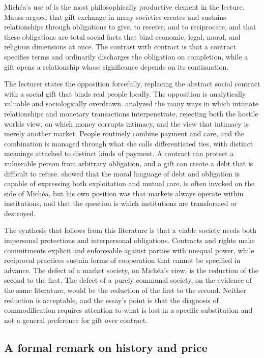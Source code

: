\documentclass[12pt]{article}
\begin{document}
Michéa's use of \citet{mauss} is the most philosophically productive element in the lecture. Mauss argued that gift exchange in many societies creates and sustains relationships through obligations to give, to receive, and to reciprocate, and that these obligations are total social facts that bind economic, legal, moral, and religious dimensions at once. The contrast with contract is that a contract specifies terms and ordinarily discharges the obligation on completion, while a gift opens a relationship whose significance depends on its continuation.

The lecturer states the opposition forcefully, replacing the abstract social contract with a social gift that binds real people locally. The opposition is analytically valuable and sociologically overdrawn. \citet{zelizer} analyzed the many ways in which intimate relationships and monetary transactions interpenetrate, rejecting both the hostile worlds view, on which money corrupts intimacy, and the view that intimacy is merely another market. People routinely combine payment and care, and the combination is managed through what she calls differentiated ties, with distinct meanings attached to distinct kinds of payment. A contract can protect a vulnerable person from arbitrary obligation, and a gift can create a debt that is difficult to refuse. \citet{graeber} showed that the moral language of debt and obligation is capable of expressing both exploitation and mutual care. \citet{polanyi} is often invoked on the side of Michéa, but his own position was that markets always operate within institutions, and that the question is which institutions are transformed or destroyed.

The synthesis that follows from this literature is that a viable society needs both impersonal protections and interpersonal obligations. Contracts and rights make commitments explicit and enforceable against parties with unequal power, while reciprocal practices sustain forms of cooperation that cannot be specified in advance. The defect of a market society, on Michéa's view, is the reduction of the second to the first. The defect of a purely communal society, on the evidence of the same literature, would be the reduction of the first to the second. Neither reduction is acceptable, and the essay's point is that the diagnosis of commodification requires attention to what is lost in a specific substitution and not a general preference for gift over contract.

\subsection{A formal remark on history and price}
\end{document}
